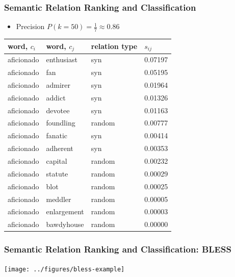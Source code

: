 \begin{frame}
\frametitle{Semantic Relation Ranking  and Classification}

\begin{itemize}
   \item Precision $P(k=50)= \frac{1}{7} \approx 0.86 $
\end{itemize}


\begin{table}[h]\footnotesize
\begin{tabular}{ |l|l|l|l| }
\hline
\bf word, $c_i$ & \bf  word, $c_j$ & \bf relation type & \bf $s_{ij}$ \\ \hline \hline

aficionado & enthusiast & syn & 0.07197 \\
aficionado & fan & syn & 0.05195 \\
aficionado & admirer & syn & 0.01964 \\
aficionado & addict & syn & 0.01326 \\
aficionado & devotee & syn & 0.01163 \\
\alert{aficionado} & \alert{foundling} & \alert{random} & \alert{0.00777} \\
aficionado & fanatic & syn & 0.00414 \\ \hline
aficionado & adherent & syn & 0.00353 \\
aficionado & capital & random & 0.00232 \\
aficionado & statute & random & 0.00029 \\
aficionado & blot & random & 0.00025 \\
aficionado & meddler & random & 0.00005 \\
aficionado & enlargement & random & 0.00003 \\
aficionado & bawdyhouse & random &  0.00000 \\ 
\hline
\end{tabular}
\end {table}

\end{frame}



\begin{frame}
\frametitle{Semantic Relation Ranking  and Classification: BLESS}

\begin{table}
\centering
\texttt{[image: ../figures/bless-example]}
\label{tbl:bless-example}
\end{table}
    
\end{frame}


